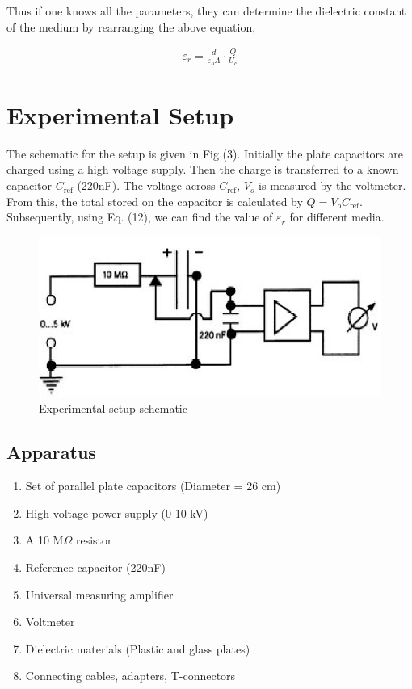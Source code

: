 Thus if one knows all the parameters, they can determine the dielectric constant of the medium by rearranging the above equation,

\begin{align}
    \varepsilon_r = \frac{d}{\varepsilon_oA} \cdot \frac{Q}{U_c}
\end{align}

\section{Experimental Setup}
The schematic for the setup is given in Fig (3). Initially the plate capacitors are charged using a high voltage supply. Then the charge is transferred to a known capacitor $C_\text{ref}$ (220nF). The voltage across $C_\text{ref}$, $V_o$ is measured by the voltmeter. From this, the total stored on the capacitor is calculated by $Q=V_oC_\text{ref}$. Subsequently, using Eq. (12), we can find the value of $\varepsilon_r$ for different media.

\begin{figure}[H]
    \centering
    \includegraphics[width=0.95\columnwidth]{images/f2.png}
    \caption{Experimental setup schematic}
    \label{fig:3}
\end{figure}

\subsection*{Apparatus}

\begin{enumerate}
    \item Set of parallel plate capacitors (Diameter = 26 cm)
    \item High voltage power supply (0-10 kV)
    \item A 10 M$\Omega$ resistor
    \item Reference capacitor (220nF)
    \item Universal measuring amplifier
    \item Voltmeter
    \item Dielectric materials (Plastic and glass plates)
    \item Connecting cables, adapters, T-connectors
\end{enumerate}

